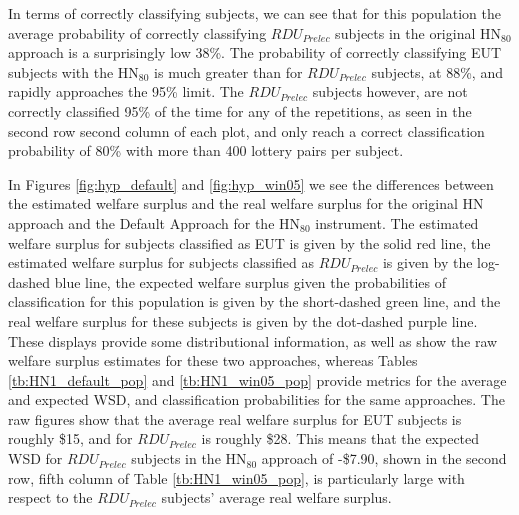 \documentclass[../main.tex]{subfiles}
\begin{document}
In terms of correctly classifying subjects, we can see that for this population the average probability of correctly classifying $\mathit{RDU_{Prelec}}$ subjects in the original $\text{HN}_{80}$ approach is a surprisingly low 38\%.
The probability of correctly classifying EUT subjects with the $\text{HN}_{80}$ is much greater than for $\mathit{RDU_{Prelec}}$ subjects, at 88\%, and rapidly approaches the 95\% limit.
The $\mathit{RDU_{Prelec}}$ subjects however, are not correctly classified 95\% of the time for any of the repetitions, as seen in the second row second column of each plot, and only reach a correct classification probability of 80\% with more than 400 lottery pairs per subject.

In Figures \ref{fig:hyp_default} and \ref{fig:hyp_win05} we see the differences between the estimated welfare surplus and the real welfare surplus for the original HN approach and the Default Approach for the $\text{HN}_{80}$ instrument.
The estimated welfare surplus for subjects classified as EUT is given by the solid red line, the estimated welfare surplus for subjects classified as $\mathit{RDU_{Prelec}}$ is given by the log-dashed blue line, the expected welfare surplus given the probabilities of classification for this population is given by the short-dashed green line, and the real welfare surplus for these subjects is given by the dot-dashed purple line.
These displays provide some distributional information, as well as show the raw welfare surplus estimates for these two approaches, whereas Tables \ref{tb:HN1_default_pop} and \ref{tb:HN1_win05_pop} provide metrics for the average and expected WSD, and classification probabilities for the same approaches.
The raw figures show that the average real welfare surplus for EUT subjects is roughly {\$}15, and for $\mathit{RDU_{Prelec}}$ is roughly {\$}28.
This means that the expected WSD for $\mathit{RDU_{Prelec}}$ subjects in the $\text{HN}_{80}$ approach of -{\$}7.90, shown in the second row, fifth column of Table \ref{tb:HN1_win05_pop}, is particularly large with respect to the $\mathit{RDU_{Prelec}}$ subjects' average real welfare surplus.
\end{document}
